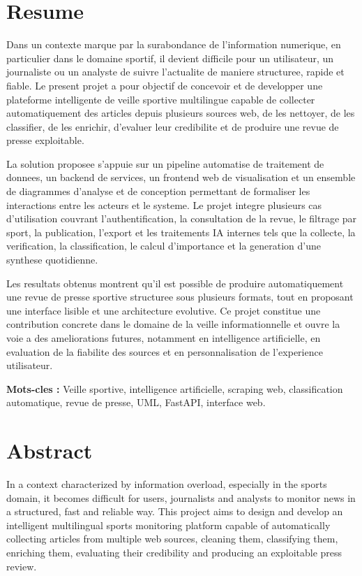 \documentclass[12pt,a4paper,oneside]{report}
\begin{document}
\chapter*{Resume}
Dans un contexte marque par la surabondance de l'information numerique, en particulier dans le domaine sportif, il devient difficile pour un utilisateur, un journaliste ou un analyste de suivre l'actualite de maniere structuree, rapide et fiable. Le present projet a pour objectif de concevoir et de developper une plateforme intelligente de veille sportive multilingue capable de collecter automatiquement des articles depuis plusieurs sources web, de les nettoyer, de les classifier, de les enrichir, d'evaluer leur credibilite et de produire une revue de presse exploitable.

La solution proposee s'appuie sur un pipeline automatise de traitement de donnees, un backend de services, un frontend web de visualisation et un ensemble de diagrammes d'analyse et de conception permettant de formaliser les interactions entre les acteurs et le systeme. Le projet integre plusieurs cas d'utilisation couvrant l'authentification, la consultation de la revue, le filtrage par sport, la publication, l'export et les traitements IA internes tels que la collecte, la verification, la classification, le calcul d'importance et la generation d'une synthese quotidienne.

Les resultats obtenus montrent qu'il est possible de produire automatiquement une revue de presse sportive structuree sous plusieurs formats, tout en proposant une interface lisible et une architecture evolutive. Ce projet constitue une contribution concrete dans le domaine de la veille informationnelle et ouvre la voie a des ameliorations futures, notamment en intelligence artificielle, en evaluation de la fiabilite des sources et en personnalisation de l'experience utilisateur.

\textbf{Mots-cles :} Veille sportive, intelligence artificielle, scraping web, classification automatique, revue de presse, UML, FastAPI, interface web.

\chapter*{Abstract}
In a context characterized by information overload, especially in the sports domain, it becomes difficult for users, journalists and analysts to monitor news in a structured, fast and reliable way. This project aims to design and develop an intelligent multilingual sports monitoring platform capable of automatically collecting articles from multiple web sources, cleaning them, classifying them, enriching them, evaluating their credibility and producing an exploitable press review.
\end{document}
